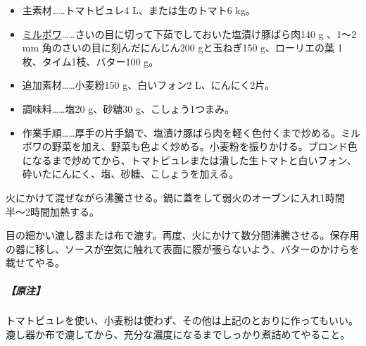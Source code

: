 \begin{recette}
\begin{itemize}
\item
  主素材\ldots{}\ldots{}トマトピュレ4 L、または生のトマト6 kg。
\item
  \protect\hyperlink{mirepoix}{ミルポワ}\ldots{}\ldots{}さいの目に切って下茹でしておいた塩漬け豚ばら肉140
  g 、1〜2 mm 角のさいの目に刻んだにんじん200 gと玉ねぎ150
  g、ローリエの葉 1枚、タイム1枝、バター100 g。
\item
  追加素材\ldots{}\ldots{}小麦粉150 g、白いフォン2 L、にんにく2片。
\item
  調味料\ldots{}\ldots{}塩20 g、砂糖30 g、こしょう1つまみ。
\item
  作業手順\ldots{}\ldots{}厚手の片手鍋で、塩漬け豚ばら肉を軽く色付くまで炒める。ミルポワの野菜を加え、野菜も色よく炒める。小麦粉を振りかける。ブロンド色になるまで炒めてから、トマトピュレまたは潰した生トマトと白いフォン、砕いたにんにく、塩、砂糖、こしょうを加える。
\end{itemize}

火にかけて混ぜながら沸騰させる。鍋に蓋をして弱火のオーブンに入れ1時間半〜2時間加熱する。

目の細かい漉し器または布で漉す。再度、火にかけて数分間沸騰させる。保存用の器に移し、ソースが空気に触れて表面に膜が張らないよう、バターのかけらを載せてやる。

\hypertarget{nota-sauce-tomate}{%
\subparagraph{【原注】}\label{nota-sauce-tomate}}

トマトピュレを使い、小麦粉は使わず、その他は上記のとおりに作ってもいい。漉し器か布で漉してから、充分な濃度になるまでしっかり煮詰めてやること。


\end{recette}
